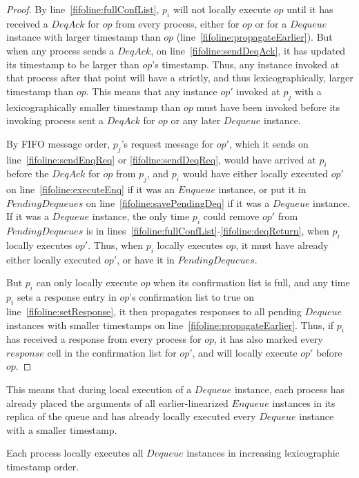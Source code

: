 \documentclass[a4paper,anonymous,USenglish]{lipics-v2021}
\theoremstyle{definition}
\begin{document}
\begin{proof}
  By line~\ref{fifoline:fullConfList}, $p_i$ will not locally execute $op$ until it has received a $DeqAck$ for $op$ from every process, either for $op$ or for a $Dequeue$ instance with larger timestamp than $op$ (line~\ref{fifoline:propagateEarlier}).  But when any process sends a $DeqAck$, on line~\ref{fifoline:sendDeqAck}, it has updated its timestamp to be larger than $op$'s timestamp.  Thus, any instance invoked at that process after that point will have a strictly, and thus lexicographically, larger timestamp than $op$.  This means that any instance $op'$ invoked at $p_j$ with a lexicographically smaller timestamp than $op$ must have been invoked before its invoking process sent a $DeqAck$ for $op$ or any later $Dequeue$ instance.

  By FIFO message order, $p_j$'s request message for $op'$, which it sends on line~\ref{fifoline:sendEnqReq} or \ref{fifoline:sendDeqReq}, would have arrived at $p_i$ before the $DeqAck$ for $op$ from $p_j$, and $p_i$ would have either locally executed $op'$ on line~\ref{fifoline:executeEnq} if it was an $Enqueue$ instance, or put it in $PendingDequeues$ on line~\ref{fifoline:savePendingDeq} if it was a $Dequeue$ instance.  If it was a $Dequeue$ instance, the only time $p_i$ could remove $op'$ from $PendingDequeues$ is in lines~\ref{fifoline:fullConfList}-\ref{fifoline:deqReturn}, when $p_i$ locally executes $op'$.  Thus, when $p_i$ locally executes $op$, it must have already either locally executed $op'$, or have it in $PendingDequeues$.

  But $p_i$ can only locally execute $op$ when its confirmation list is full, and any time $p_i$ sets a response entry in $op$'s confirmation list to true on line~\ref{fifoline:setResponse}, it then propagates responses to all pending $Dequeue$ instances with smaller timestamps on line~\ref{fifoline:propagateEarlier}.  Thus, if $p_i$ has received a response from every process for $op$, it has also marked every $response$ cell in the confirmation list for $op'$, and will locally execute $op'$ before $op$.
\end{proof}

This means that during local execution of a $Dequeue$ instance, each process has already placed the arguments of all earlier-linearized $Enqueue$ instances in its replica of the queue and has already locally executed every $Dequeue$ instance with a smaller timestamp.  

\begin{corollary}\label{fifolem:localExecOrder}
  Each process locally executes all $Dequeue$ instances in increasing lexicographic timestamp order.
\end{corollary}
\end{document}
